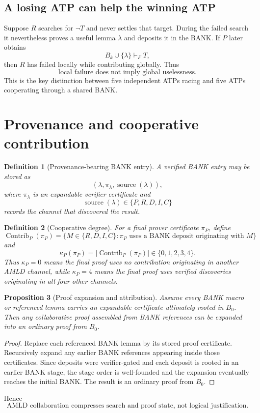 \documentclass[11pt]{article}
\newtheorem{definition}{Definition}[section]
\newtheorem{proposition}[definition]{Proposition}
\theoremstyle{remark}
\begin{document}
\subsection{A losing ATP can help the winning ATP}
Suppose $R$ searches for $\neg T$ and never settles that target. During the failed search it nevertheless proves a useful lemma $\lambda$ and deposits it in the BANK. If $P$ later obtains
\[
B_k\cup\{\lambda\}\vdash_FT,
\]
then $R$ has failed locally while contributing globally. Thus
\[
\text{local failure does not imply global uselessness.}
\]
This is the key distinction between five independent ATPs racing and five ATPs cooperating through a shared BANK.

\section{Provenance and cooperative contribution}
\begin{definition}[Provenance-bearing BANK entry]
A verified BANK entry may be stored as
\[
(\lambda,\pi_\lambda,\operatorname{source}(\lambda)),
\]
where $\pi_\lambda$ is an expandable verifier certificate and
\[
\operatorname{source}(\lambda)\in\{P,R,D,I,C\}
\]
records the channel that discovered the result.
\end{definition}

\begin{definition}[Cooperative degree]
For a final prover certificate $\pi_P$, define
\[
\operatorname{Contrib}_P(\pi_P)=\{M\in\{R,D,I,C\}:\pi_P\text{ uses a BANK deposit originating with }M\}
\]
and
\[
\kappa_P(\pi_P)=|\operatorname{Contrib}_P(\pi_P)|\in\{0,1,2,3,4\}.
\]
Thus $\kappa_P=0$ means the final proof uses no contribution originating in another AMLD channel, while $\kappa_P=4$ means the final proof uses verified discoveries originating in all four other channels.
\end{definition}

\begin{proposition}[Proof expansion and attribution]
Assume every BANK macro or referenced lemma carries an expandable certificate ultimately rooted in $B_0$. Then any collaborative proof assembled from BANK references can be expanded into an ordinary proof from $B_0$.
\end{proposition}
\begin{proof}
Replace each referenced BANK lemma by its stored proof certificate. Recursively expand any earlier BANK references appearing inside those certificates. Since deposits were verifier-gated and each deposit is rooted in an earlier BANK stage, the stage order is well-founded and the expansion eventually reaches the initial BANK. The result is an ordinary proof from $B_0$.
\end{proof}
Hence
\[
\text{AMLD collaboration compresses search and proof state, not logical justification.}
\]
\end{document}
